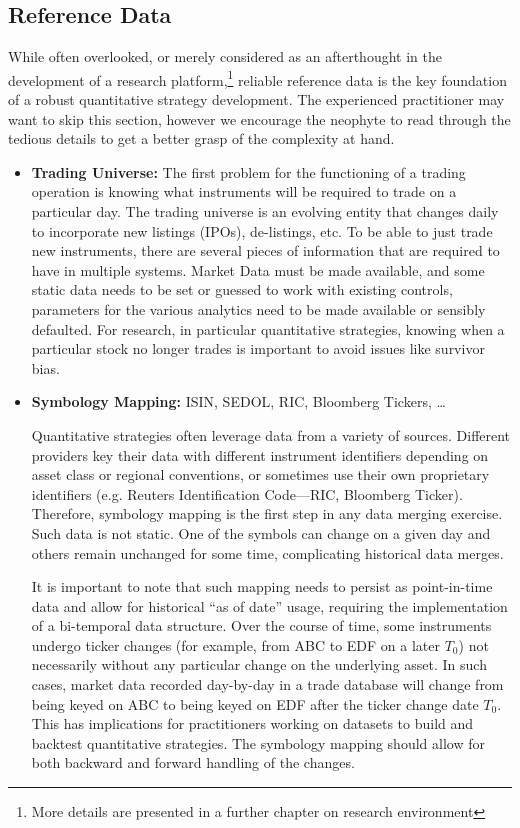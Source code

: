 \subsection{Reference Data\label{sec:reference_data}} 

While often overlooked, or merely considered as an afterthought in the development of a research platform,\footnote{More details are presented in a further chapter on research environment} reliable reference data is the key foundation of a robust quantitative strategy development. The experienced practitioner may want to skip this section, however we encourage the neophyte to read through the tedious details to get a better grasp of the complexity at hand.


\begin{itemize}
\item \textbf{Trading Universe:} The first problem for the functioning of a trading operation is knowing what instruments will be required to trade on a particular day. The trading universe is an evolving entity that changes daily to incorporate new listings (IPOs), de-listings, etc. To be able to just trade new instruments, there are several pieces of information that are required to have in multiple systems. Market Data must be made available, and some static data needs to be set or guessed to work with existing controls, parameters for the various analytics need to be made available or sensibly defaulted. For research, in particular quantitative strategies, knowing when a particular stock no longer trades is important to avoid issues like survivor bias.
 
\item \textbf{Symbology Mapping:} ISIN, SEDOL, RIC, Bloomberg Tickers, \dots 


Quantitative strategies often leverage data from a variety of sources. Different providers key their data with different instrument identifiers depending on asset class or regional conventions, or sometimes use their own proprietary identifiers (e.g. Reuters Identification Code---RIC, Bloomberg Ticker). Therefore, symbology mapping is the first step in any data merging exercise. Such data is not static. One of the symbols can change on a given day and others remain unchanged for some time, complicating historical data merges.


It is important to note that such mapping needs to persist as point-in-time data and allow for historical ``as of date'' usage, requiring the implementation of a bi-temporal data structure. Over the course of time, some instruments undergo ticker changes (for example, from ABC to EDF on a later $T_0$) not necessarily without any particular change on the underlying asset. In such cases, market data recorded day-by-day in a trade database will change from being keyed on ABC to being keyed on EDF after the ticker change date $T_0$. This has implications for practitioners working on datasets to build and backtest quantitative strategies. The symbology mapping should allow for both backward and forward handling of the changes.



\end{itemize}

